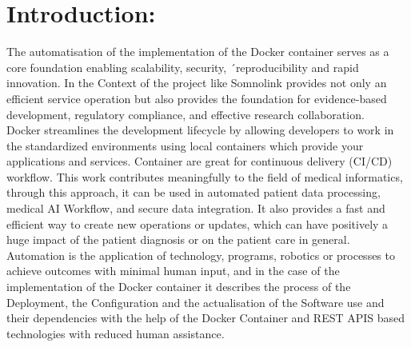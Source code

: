 \documentclass{article}
\begin{document}
\section{Introduction:}

The automatisation of the implementation of the Docker container serves as a core foundation enabling scalability, security, ´reproducibility and rapid innovation. In the Context of the project like Somnolink provides not only an efficient service operation but also provides the foundation for evidence-based development, regulatory compliance, and effective research collaboration.\\
Docker streamlines the development lifecycle by allowing developers to work in the standardized environments using local containers which provide your applications and services. Container are great for continuous delivery (CI/CD) workflow.
This work contributes meaningfully to the field of medical informatics, through this approach, it can be used in automated patient data processing, medical AI Workflow, and secure data integration. It also provides a fast and efficient way to create new operations or updates, which can have positively a huge impact of the patient diagnosis or on the patient care in general.\\Automation is the application of technology, programs, robotics or processes to achieve outcomes with minimal human input, and in the case of the implementation of the Docker container it describes the process of the Deployment, the Configuration and the actualisation of the Software use and their dependencies with the help of the Docker Container and REST APIS based technologies with reduced human assistance. 
\end{document}
